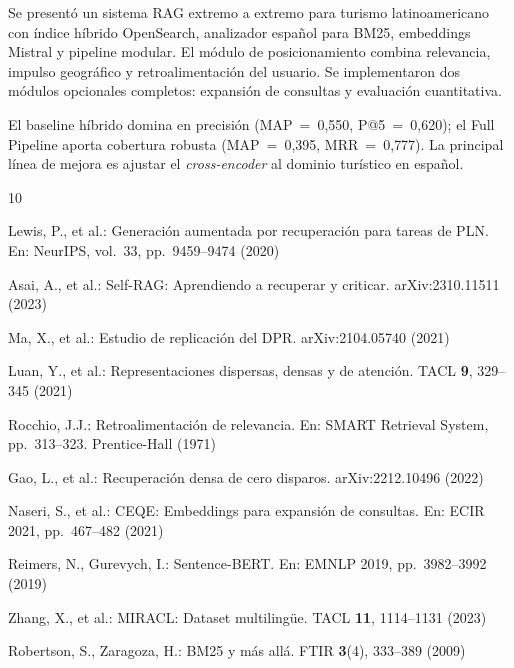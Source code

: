 \documentclass[runningheads]{llncs}
\begin{document}
Se present\'o un sistema RAG extremo a extremo para turismo latinoamericano
con \'indice h\'ibrido OpenSearch, analizador espa\~nol para BM25,
embeddings Mistral y pipeline modular. El m\'odulo de posicionamiento
combina relevancia, impulso geogr\'afico y retroalimentaci\'on del
usuario. Se implementaron dos m\'odulos opcionales completos: expansi\'on
de consultas y evaluaci\'on cuantitativa.

El baseline h\'ibrido domina en precisi\'on (MAP~=~0{,}550,
P@5~=~0{,}620); el Full Pipeline aporta cobertura robusta
(MAP~=~0{,}395, MRR~=~0{,}777). La principal l\'inea de mejora es ajustar
el \textit{cross-encoder} al dominio tur\'istico en espa\~nol.


\begin{thebibliography}{10}

Lewis, P., et al.: Generaci\'on aumentada por recuperaci\'on para tareas
de PLN. En: NeurIPS, vol.~33, pp.~9459--9474 (2020)

Asai, A., et al.: Self-RAG: Aprendiendo a recuperar y criticar.
arXiv:2310.11511 (2023)

Ma, X., et al.: Estudio de replicaci\'on del DPR. arXiv:2104.05740 (2021)

Luan, Y., et al.: Representaciones dispersas, densas y de atenci\'on.
TACL \textbf{9}, 329--345 (2021)

Rocchio, J.J.: Retroalimentaci\'on de relevancia. En: SMART Retrieval
System, pp.~313--323. Prentice-Hall (1971)

Gao, L., et al.: Recuperaci\'on densa de cero disparos.
arXiv:2212.10496 (2022)

Naseri, S., et al.: CEQE: Embeddings para expansi\'on de consultas.
En: ECIR 2021, pp.~467--482 (2021)

Reimers, N., Gurevych, I.: Sentence-BERT. En: EMNLP 2019,
pp.~3982--3992 (2019)

Zhang, X., et al.: MIRACL: Dataset multiling\"ue. TACL \textbf{11},
1114--1131 (2023)

Robertson, S., Zaragoza, H.: BM25 y m\'as all\'a. FTIR \textbf{3}(4),
333--389 (2009)

\end{thebibliography}
\end{document}
